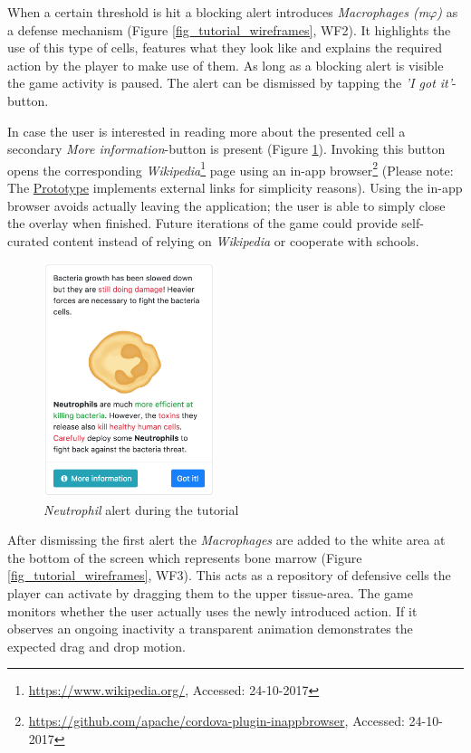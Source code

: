 When a certain threshold is hit a blocking alert introduces \textit{Macrophages (m$\varphi$)} as a defense mechanism (Figure \ref{fig_tutorial_wireframes}, WF2). It highlights the use of this type of cells, features what they look like and explains the required action by the player to make use of them. As long as a blocking alert is visible the game activity is paused. The alert can be dismissed by tapping the \textit{'I got it'}-button.

In case the user is interested in reading more about the presented cell a secondary \textit{More information}-button is present (Figure \ref{fig_prototype_alert}). Invoking this button opens the corresponding \textit{Wikipedia}\footnote{\url{https://www.wikipedia.org/}, Accessed: 24-10-2017} page using an in-app browser\footnote{\url{https://github.com/apache/cordova-plugin-inappbrowser}, Accessed: 24-10-2017} (Please note: The \hyperref[prototype]{Prototype} implements external links for simplicity reasons). Using the in-app browser avoids actually leaving the application; the user is able to simply close the overlay when finished. Future iterations of the game could provide self-curated content instead of relying on \textit{Wikipedia} or cooperate with schools.

\begin{figure}
  \includegraphics[width=5cm]{assets/prototype_modal.png}
  \caption{\textit{Neutrophil} alert during the tutorial}
  \centering
  \label{fig_prototype_alert}
\end{figure}

After dismissing the first alert the \textit{Macrophages} are added to the white area at the bottom of the screen which represents bone marrow (Figure \ref{fig_tutorial_wireframes}, WF3). This acts as a repository of defensive cells the player can activate by dragging them to the upper tissue-area. The game monitors whether the user actually uses the newly introduced action. If it observes an ongoing inactivity a transparent animation demonstrates the expected drag and drop motion.

